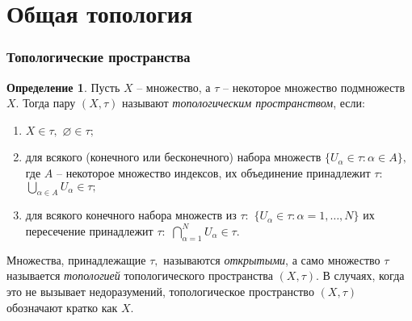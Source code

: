 \documentclass[b5paper]{book}
\theoremstyle{definition}
\newtheorem{definition}{Определение}
\let\emptyset\varnothing
\begin{document}
\section* {Общая топология}

\subsubsection*{Топологические пространства}

\begin{definition}
 Пусть $X$ -- множество, а $\tau$ -- некоторое множество подмножеств $X.$ Тогда пару
 $(X, \tau)$ называют  \emph{топологическим пространством}, если:
 \begin{enumerate}[label={\arabic*\textdegree.}]
  \item $X\in \tau,$ $\emptyset \in \tau;$
  \item для всякого (конечного или бесконечного) набора множеств
  $\{U_\alpha \in \tau: \alpha \in A\},$ где $A$ -- некоторое множество индексов,
  их объединение принадлежит $\tau:$ $\bigcup\limits_{\alpha \in A} U_\alpha \in \tau;$
  \item для всякого конечного набора множеств из $\tau:$
  $\{U_\alpha\in\tau: \alpha = 1, \dots , N\}$ их пересечение принадлежит $\tau:$
  $\bigcap\limits_{\alpha=1}^{N} U_\alpha \in \tau.$
 \end{enumerate}
\end{definition}
Множества, принадлежащие $\tau,$ называются 
\emph{открытыми}, а само множество $\tau$ называется  \emph{топологией} топологического пространства $(X, \tau)$. В случаях, когда это не вызывает недоразумений,
топологическое пространство $(X, \tau)$ обозначают кратко как $X.$

%

\printindex
\end{document}
